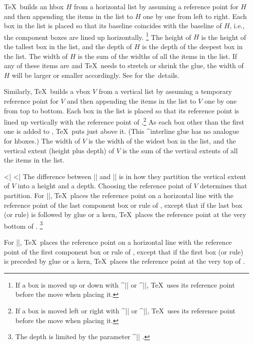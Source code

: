 {\tighten
\TeX\ builds an hbox $H$ from a horizontal list by assuming
a reference point for $H$ and then appending the items in the list to $H$
one by one from left to right.
Each box in the list is placed so that its baseline coincides with the
baseline of $H$\kern-2pt,
i.e., the component boxes are lined up horizontally.%
\footnote{If a box is moved up or down with ^|\raise| or 
^|\lower|, \TeX\ uses its reference point before the move when
placing it.}
The height of $H$ is the
height of the tallest box in the list, and the depth of $H$ is the depth
of the deepest box in the list.
The width of $H$ is the sum of the
widths of all the items in the list.
If any of these items are  and \TeX\ needs to stretch or shrink
the glue,
the width of $H$ will be larger or smaller accordingly.
See  for the~details.
\par}

Similarly, \TeX\ builds a vbox $V$ from a vertical list by assuming a
temporary reference point for $V$ and then appending the items in the
list to $V$ one by one from top to bottom.  Each box in the list is
placed so that its reference point is lined up vertically with the
reference point of \Vperiod.\footnote{If a box is moved left or right with
^|\moveleft| or ^|\moveright|, \TeX\ uses its reference point before the
move when placing it.} As each box other than the first one is added to
\Vcomma, \TeX\ puts  just above it.  (This
^{interline glue} has no analogue for hboxes.)  The width of $V$ is the
width of the widest box in the list, and the vertical extent (height
plus depth) of $V$ is the sum of the vertical extents of all the
items in the list.

\bix^^|\vbox|
\bix^^|\vtop|
The difference between |\vbox| and |\vtop| is in how they partition
the vertical extent of $V$ into a height and a depth.
Choosing the reference point of $V$ determines that partition.
\ulist
\li For |\vbox|, \TeX\ places the reference point on a horizontal line
with the reference point of the last component box 
or rule of \Vcomma, except
that if the last box (or rule) is followed by glue or a kern, \TeX\ places the
reference point at the very bottom of \Vperiod.%
\footnote{The depth is limited by
the parameter ^|\boxmaxdepth| \ctsref{\boxmaxdepth}.}

\li For |\vtop|, \TeX\ places the reference point on a horizontal line
with the reference point of the first component box or rule of \Vcomma,
except that if the first box (or rule)
is preceded by glue or a kern, \TeX\ places
the reference point at the very top of \Vperiod.

